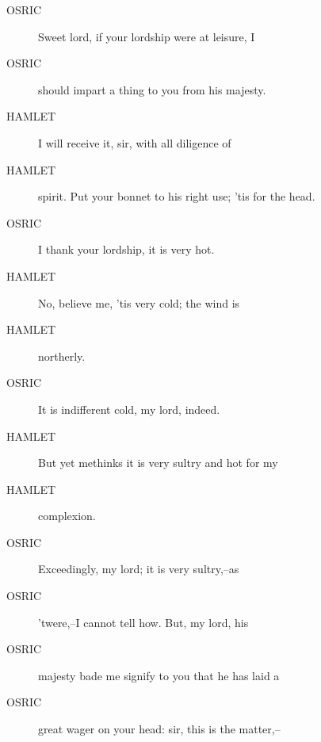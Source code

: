 \documentclass{article}
\begin{document}
\begin{description}
            
\item[OSRIC] Sweet lord, if your lordship were at leisure, I
\item[OSRIC] should impart a thing to you from his majesty.
\end{description}
          
\begin{description}
            
\item[HAMLET] I will receive it, sir, with all diligence of
\item[HAMLET] spirit. Put your bonnet to his right use; 'tis for the head.
\end{description}
          
\begin{description}
            
\item[OSRIC] I thank your lordship, it is very hot.
\end{description}
          
\begin{description}
            
\item[HAMLET] No, believe me, 'tis very cold; the wind is
\item[HAMLET] northerly.
\end{description}
          
\begin{description}
            
\item[OSRIC] It is indifferent cold, my lord, indeed.
\end{description}
          
\begin{description}
            
\item[HAMLET] But yet methinks it is very sultry and hot for my
\item[HAMLET] complexion.
\end{description}
          
\begin{description}
            
\item[OSRIC] Exceedingly, my lord; it is very sultry,--as
\item[OSRIC] 'twere,--I cannot tell how. But, my lord, his
\item[OSRIC] majesty bade me signify to you that he has laid a
\item[OSRIC] great wager on your head: sir, this is the matter,--
\end{description}
          
\end{document}
